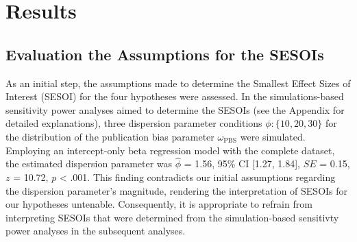 \documentclass[
  12pt,
]{scrartcl}
\newcommand{\pbs}{\omega_{\text{PBS}}}
\begin{document}
\begin{table}[H]
\centering
\caption{\label{tab:unnamed-chunk-13}Smallest Effect Sizes of Interest of the Hypotheses}
\centering
{}
\end{table}

\newpage

\section{Results}\label{results}

\subsection{Evaluation the Assumptions for the
SESOIs}\label{evaluation-the-assumptions-for-the-sesois}

As an initial step, the assumptions made to determine the Smallest
Effect Sizes of Interest (SESOI) for the four hypotheses were assessed.
In the simulations-based sensitivity power analyses aimed to determine
the SESOIs (see the Appendix for detailed explanations), three
dispersion parameter conditions \(\phi:\{10, 20, 30\}\) for the
distribution of the publication bias parameter \(\pbs\) were simulated.
Employing an intercept-only beta regression model with the complete
dataset, the estimated dispersion parameter was \(\widehat{\phi}\) =
1.56, 95\% CI {[}1.27, 1.84{]}, \(SE\) = 0.15, \(z\) = 10.72, \(p\)
\textless{} .001. This finding contradicts our initial assumptions
regarding the dispersion parameter's magnitude, rendering the
interpretation of SESOIs for our hypotheses untenable. Consequently, it
is appropriate to refrain from interpreting SESOIs that were determined
from the simulation-based sensitivty power analyses in the subsequent
analyses.
\end{document}
